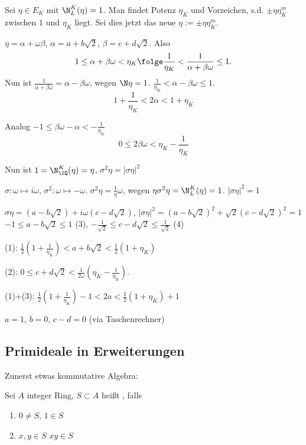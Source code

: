 Sei $\eta\in E_K$ mit $\N_L^K(\eta)=1$. Man findet Potenz $\eta_K$ und Vorzeichen, s.d. $\pm\eta\eta_K^m$ zwischen $1$ und $\eta_K$ liegt. Sei dies jetzt das neue $\eta:=\pm\eta\eta_K^m$.

$\eta=\alpha+\omega\beta$, $\alpha=a+b\sqrt{2}$, $\beta=c+d\sqrt 2$. Also \[1\leq \alpha+\beta\omega<\eta_K \folge \frac{1}{\eta_K}<\frac{1}{\alpha+\beta\omega}\leq 1.\]
Nun ist $\frac{1}{\alpha+\beta\omega}=\alpha-\beta\omega$, wegen $\N\eta=1$. \folge $\frac{1}{\eta_K}<\alpha-\beta\omega\leq 1$.
\begin{equation}
 1+\frac{1}{\eta_K}<2\alpha<1+\eta_K
\end{equation}

Analog $-1\leq \beta\omega-\alpha<-\frac{1}{\eta_K}$ \folge
\begin{equation}
 0\leq 2\beta\omega < \eta_K-\frac{1}{\eta_K}
\end{equation}

Nun ist $1=\N_\IQ^K(\eta)=\eta$, $\sigma^2\eta=|\sigma\eta|^2$

$\sigma: \omega\mapsto i\omega$, $\sigma^2: \omega\mapsto -\omega$. $\sigma^2\eta=\frac{1}{\eta}\omega$, wegen $\eta\sigma^2\eta=\N_L^K(\eta)=1$. \folge $|\sigma\eta|^2=1$

$\sigma\eta=(a-b\sqrt{2})+i\omega(c-d\sqrt{2})$, $|\sigma\eta|^2=(a-b\sqrt{2})^2+\sqrt 2(c-d\sqrt 2)^2=1$ \folge $-1\leq a-b\sqrt{2}\leq 1$ (3), \folge $-\frac{1}{\sqrt 2} \leq c-d\sqrt{2}\leq\frac{1}{\sqrt 2}$ (4)

(1): $\frac{1}{2}(1+\frac{1}{\eta_K})<a+b\sqrt 2< \frac{1}{2}(1+\eta_K)$

(2): $0\leq c+d\sqrt 2 < \frac{1}{2\omega} (\eta_K-\frac{1}{\eta_K})$.

(1)+(3): $\frac{1}{2} (1+\frac{1}{\eta_K})-1<2a<\frac{1}{2}(1+\eta_K)+1$ 

\folge $a=1$, $b=0$, $c-d=0$ (via Taschenrechner)

\subsection{Primideale in Erweiterungen}
Zunerst etwas kommutative Algebra:

\begin{Definition}
 Sei $A$ integer Ring, $S\subset A$ heißt , falls
 \begin{enumerate}
  \item $0\neq S$, $1\in S$
  \item $x,y\in S$ \folge $xy\in S$
 \end{enumerate}
\end{Definition}

